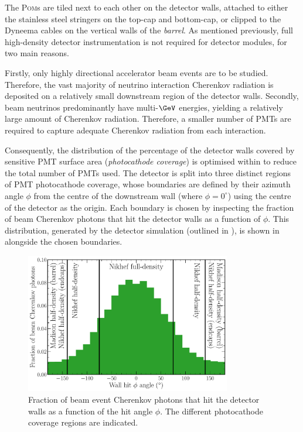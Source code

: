 The \textsc{Pom}s are tiled next to each other on the detector walls, attached to either the
stainless steel stringers on the top-cap and bottom-cap, or clipped to the Dyneema cables on the
vertical walls of the \emph{barrel}. As mentioned previously, full high-density detector
instrumentation is not required for \chips detector modules, for two main reasons.

Firstly, only highly directional accelerator beam events are to be studied. Therefore, the vast
majority of neutrino interaction Cherenkov radiation is deposited on a relatively small downstream
region of the detector walls. Secondly, beam neutrinos predominantly have multi-$\GeV$ energies,
yielding a relatively large amount of Cherenkov radiation. Therefore, a smaller number of PMTs are
required to capture adequate Cherenkov radiation from each interaction.

Consequently, the distribution of the percentage of the detector walls covered by sensitive PMT
surface area (\emph{photocathode coverage}) is optimised within \chipsfive to reduce the total
number of PMTs used. The detector is split into three distinct regions of PMT photocathode
coverage, whose boundaries are defined by their azimuth angle $\phi$ from the centre of the
downstream wall (where $\phi=0^{\circ}$) using the centre of the detector as the origin. Each
boundary is chosen by inspecting the fraction of beam Cherenkov photons that hit the detector
walls as a function of $\phi$. This distribution, generated by the detector simulation (outlined
in ), is shown in  alongside the
chosen boundaries.

\begin{figure} %
    \includegraphics[width=0.8\textwidth]{diagrams/4-chips/coverage.pdf}
    \caption[Fraction of beam event Cherenkov photons that hit the detector walls as a function of
        the hit angle] {Fraction of beam event Cherenkov photons that hit the detector walls as a
        function of the hit angle $\phi$. The different photocathode coverage regions are
        indicated.}
    \label{fig:coverage}
\end{figure}

